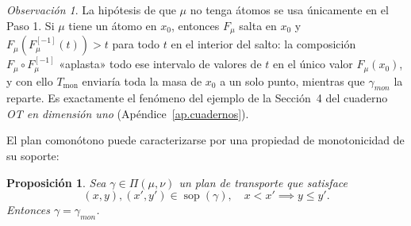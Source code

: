 \documentclass[12pt, a4paper]{amsbook}
\newtheorem{prop}[teo]{Proposición}
\theoremstyle{remark}
\newtheorem{obs}[teo]{Observación}
\theoremstyle{definition}
\numberwithin{section}{chapter}
\numberwithin{subsection}{section}
\numberwithin{equation}{section}
\numberwithin{figure}{chapter}
\begin{document}
\begin{obs}
La hipótesis de que $\mu$ no tenga átomos se usa únicamente en el Paso 1.
Si $\mu$ tiene un átomo en $x_0$, entonces $F_\mu$ salta en $x_0$ y
$F_\mu(F_\mu^{[-1]}(t))>t$ para todo $t$ en el interior del salto: la
composición $F_\mu\circ F_\mu^{[-1]}$ «aplasta» todo ese intervalo de valores
de $t$ en el único valor $F_\mu(x_0)$, y con ello $T_\text{mon}$ enviaría toda
la masa de $x_0$ a un solo punto, mientras que $\gamma_{mon}$ la reparte.
Es exactamente el fenómeno del ejemplo de la Sección~4 del cuaderno
\emph{OT en dimensión uno} (Apéndice~\ref{ap.cuadernos}).
\end{obs}

El plan comonótono puede caracterizarse por una propiedad de monotonicidad de su
soporte:
\begin{prop}\label{prop:soporte-monotono}
Sea $\gamma\in\Pi(\mu,\nu)$ un plan de transporte que satisface
\[
(x,y),(x',y')\in\operatorname{sop}(\gamma),\quad x<x'
\implies
y\le y'.
\]
Entonces $\gamma=\gamma_{mon}$.
\end{prop}
\end{document}
